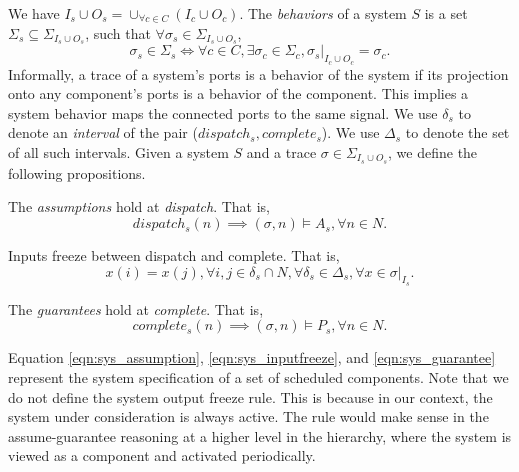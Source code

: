 We have $I_s  \cup O_s = \cup_{\forall c \in C}(I_c \cup O_c)$.
The \emph{behaviors} of a system $S$ is a set $\Sigma_s \subseteq \Sigma_{I_s \cup O_s}$, such that $\forall \sigma_s \in \Sigma_{I_s \cup O_s}$, 
\begin{equation*}
	\sigma_s\in \Sigma_s  \iff \forall c \in C, \exists \sigma_c \in \Sigma_c, \sigma_s|_{I_c \cup O_c} = \sigma_c.
\end{equation*}
Informally, a trace of a system's ports is a behavior of the system if its projection onto any component's ports is a behavior of the component. 
This implies a system behavior maps the connected ports to the same signal.
We use $\delta_s$ to denote an \emph{interval} of the pair ($dispatch_s, complete_s$). We use $\Delta_s$ to denote the set of all such intervals.
Given a system $S$ and a trace $\sigma \in \Sigma_{I_s \cup O_s}$, we define the following propositions.

The \emph{assumptions} hold at \emph{dispatch}. That is,
\begin{equation} 
\label{eqn:sys_assumption}
	dispatch_s(n) \implies (\sigma, n) \models A_s, \forall n\in N.
\end{equation}

Inputs freeze between dispatch and complete. That is,
\begin{equation} 
\label{eqn:sys_inputfreeze}
	x(i) = x(j), \forall i,j\in \delta_s \cap N, \forall \delta_s \in \Delta_s, \forall x \in \sigma|_{I_s}.
\end{equation}

The \emph{guarantees} hold at \emph{complete}. That is,
\begin{equation} 
\label{eqn:sys_guarantee}
	complete_s(n) \implies (\sigma, n) \models P_s, \forall n\in N.
\end{equation}

Equation \ref{eqn:sys_assumption}, \ref{eqn:sys_inputfreeze}, and \ref{eqn:sys_guarantee} represent the system specification of a set of scheduled components.
Note that we do not define the system output freeze rule. This is because in our context, the system under consideration is always active. The rule would make sense in the assume-guarantee reasoning at a higher level in the hierarchy, where the system is viewed as a component and activated periodically.
